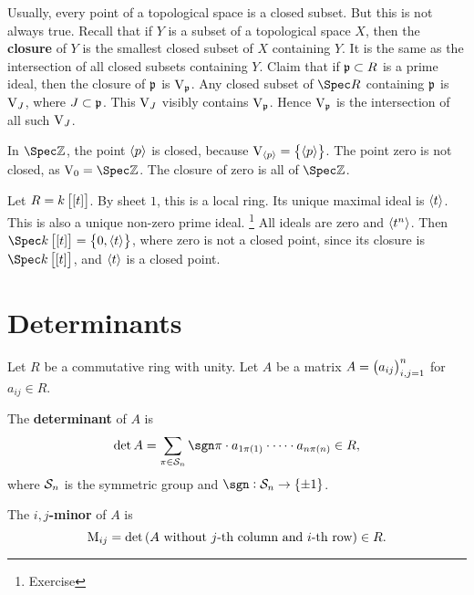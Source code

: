 Usually, every point of a topological space is a closed subset. But this is not always true. Recall that if $ Y $ is a subset of a topological space $ X $, then the \textbf{closure} of $ Y $ is the smallest closed subset of $ X $ containing $ Y $. It is the same as the intersection of all closed subsets containing $ Y $. Claim that if $ \mathfrak{p} \subset R $ is a prime ideal, then the closure of $ \mathfrak{p} $ is $ \mathrm{V}_{\mathfrak{p}} $. Any closed subset of $ \Spec R $ containing $ \mathfrak{p} $ is $ \mathrm{V}_J $, where $ J \subset \mathfrak{p} $. This $ \mathrm{V}_J $ visibly contains $ \mathrm{V}_{\mathfrak{p}} $. Hence $ \mathrm{V}_{\mathfrak{p}} $ is the intersection of all such $ \mathrm{V}_J $.

\begin{example*}
In $ \Spec \ZZ $, the point $ \left\langle p \right\rangle $ is closed, because $ \V_{\abr{p}} = \cbr{\abr{p}} $. The point zero is not closed, as $ \V_{0} = \Spec \ZZ $. The closure of zero is all of $ \Spec \ZZ $.
\end{example*}

\begin{example*}
Let $ R = k\sbr{\sbr{t}} $. By sheet $ 1 $, this is a local ring. Its unique maximal ideal is $ \left\langle t \right\rangle $. This is also a unique non-zero prime ideal. \footnote{Exercise} All ideals are zero and $ \left\langle t^n \right\rangle $. Then $ \Spec k\sbr{\sbr{t}} = \cbr{0, \abr{t}} $, where zero is not a closed point, since its closure is $ \Spec k\sbr{\sbr{t}} $, and $ \left\langle t \right\rangle $ is a closed point.
\end{example*}

\pagebreak

\section{Determinants}


Let $ R $ be a commutative ring with unity. Let $ A $ be a matrix $ A = \br{a_{ij}}_{i, j = 1}^n $ for $ a_{ij} \in R $.

\begin{definition}
The \textbf{determinant} of $ A $ is
$$ \det A = \sum_{\pi \in \SSS_n} \sgn \pi \cdot a_{1\pi\br{1}} \cdot \dots \cdot a_{n\pi\br{n}} \in R, $$
where $ \mathcal{S}_n $ is the symmetric group and $ \sgn : \SSS_n \to \cbr{\pm 1} $.
\end{definition}

\begin{definition}
The \textbf{$ i, j $-minor} of $ A $ is
$$ \M_{ij} = \det\br{A \ \text{without $ j $-th column and $ i $-th row}} \in R. $$
\end{definition}

